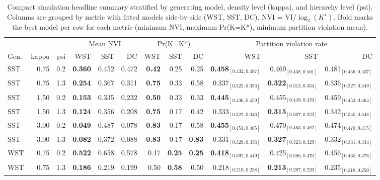 \begin{table}[!h]
\centering
\caption{Compact simulation headline summary stratified by generating model, density level (kappa), and hierarchy level (psi). Columns are grouped by metric with fitted models side-by-side (WST, SST, DC). NVI = VI$/\log_2(K^\star)$. Bold marks the best model per row for each metric (minimum NVI, maximum Pr(K=K*), minimum partition violation mean).\\\label{tab:sim-headline-compact}}
\centering
\begin{tabular}[t]{lrrrrrrrrrrr}
\toprule
\multicolumn{3}{c}{ } & \multicolumn{3}{c}{Mean NVI} & \multicolumn{3}{c}{Pr(K=K*)} & \multicolumn{3}{c}{Partition violation rate} \\
\cmidrule(l{3pt}r{3pt}){4-6} \cmidrule(l{3pt}r{3pt}){7-9} \cmidrule(l{3pt}r{3pt}){10-12}
Gen. & kappa & psi & WST & SST & DC & WST & SST & DC & WST & SST & DC\\
\midrule
SST & 0.75 & 0.2 & \textbf{0.360} & 0.452 & 0.472 & \textbf{0.42} & 0.25 & 0.25 & \textbf{0.458$_{[0.432,0.487]}$} & 0.469$_{[0.438,0.501]}$ & 0.481$_{[0.459,0.507]}$\\
SST & 0.75 & 1.3 & \textbf{0.254} & 0.367 & 0.311 & \textbf{0.75} & 0.33 & 0.58 & 0.337$_{[0.325,0.356]}$ & \textbf{0.322$_{[0.313,0.334]}$} & 0.336$_{[0.327,0.349]}$\\
SST & 1.50 & 0.2 & \textbf{0.153} & 0.335 & 0.232 & \textbf{0.50} & 0.33 & 0.33 & \textbf{0.445$_{[0.436,0.459]}$} & 0.455$_{[0.448,0.470]}$ & 0.459$_{[0.453,0.464]}$\\
SST & 1.50 & 1.3 & \textbf{0.124} & 0.356 & 0.208 & \textbf{0.75} & 0.17 & 0.42 & 0.333$_{[0.322,0.346]}$ & \textbf{0.315$_{[0.307,0.323]}$} & 0.342$_{[0.340,0.348]}$\\
SST & 3.00 & 0.2 & \textbf{0.049} & 0.487 & 0.078 & \textbf{0.83} & 0.17 & 0.58 & \textbf{0.455$_{[0.451,0.465]}$} & 0.470$_{[0.463,0.482]}$ & 0.474$_{[0.470,0.475]}$\\
SST & 3.00 & 1.3 & \textbf{0.082} & 0.372 & 0.088 & \textbf{0.83} & 0.17 & \textbf{0.83} & 0.331$_{[0.328,0.336]}$ & \textbf{0.327$_{[0.323,0.329]}$} & 0.332$_{[0.331,0.334]}$\\
WST & 0.75 & 0.2 & \textbf{0.522} & 0.658 & 0.578 & 0.17 & \textbf{0.25} & \textbf{0.25} & \textbf{0.418$_{[0.392,0.449]}$} & 0.425$_{[0.386,0.470]}$ & 0.456$_{[0.435,0.476]}$\\
WST & 0.75 & 1.3 & \textbf{0.186} & 0.219 & 0.199 & 0.50 & \textbf{0.58} & 0.50 & 0.218$_{[0.210,0.238]}$ & \textbf{0.213$_{[0.207,0.220]}$} & 0.235$_{[0.218,0.250]}$\\

\end{tabular}
\end{table}

